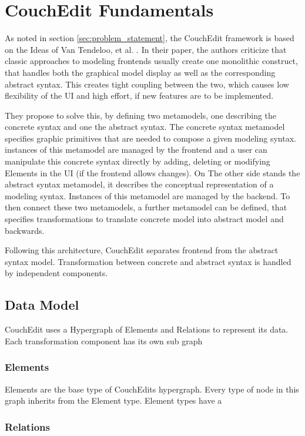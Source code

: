\chapter{CouchEdit Fundamentals}
As noted in section \ref{sec:problem_statement}, the CouchEdit framework is based on the Ideas of Van Tendeloo, et al. \cite{van_tendeloo_concrete_2017}. In their paper, the authors criticize that classic approaches to modeling frontends usually create one monolithic construct, that handles both the graphical model display as well as the corresponding abstract syntax. This creates tight coupling between the two, which causes low flexibility of the UI and high effort, if new features are to be implemented. 

They propose to solve this, by defining two metamodels, one describing the concrete syntax and one the abstract syntax. The concrete syntax metamodel specifies graphic primitives that are needed to compose a given modeling syntax. instances of this metamodel are managed by the frontend and a user can manipulate this concrete syntax directly by adding, deleting or modifying Elements in the UI (if the frontend allows changes). On The other side stands the abstract syntax metamodel, it describes the conceptual representation of a modeling syntax. Instances of this metamodel are managed by the backend. To then connect these two metamodels, a further metamodel can be defined, that specifies transformations to translate concrete model into abstract model and backwards. 

Following this architecture, CouchEdit separates frontend from the abstract syntax model. Transformation between concrete and abstract syntax is handled by independent components. 


\section{Data Model}
CouchEdit uses a Hypergraph of Elements and Relations to represent its data. Each transformation component has its own sub graph 


\subsection{Elements}
Elements are the base type of CouchEdits hypergraph. Every type of node in this graph inherits from the Element type. Element types have a 

\subsection{Relations}


